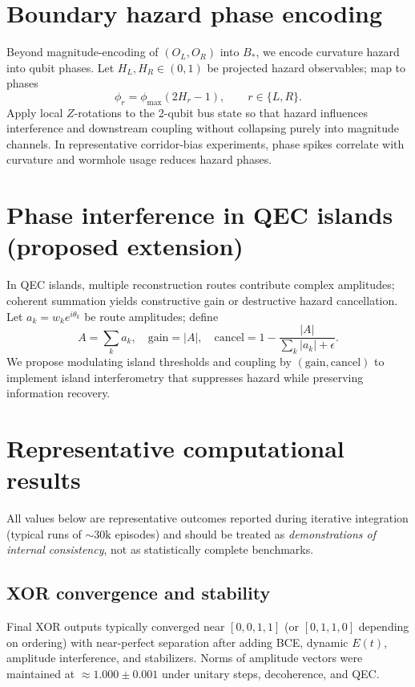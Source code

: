 \documentclass[11pt]{article}
\begin{document}
\section{Boundary hazard phase encoding}
\label{sec:busphase}
Beyond magnitude-encoding of $(O_L,O_R)$ into $B_{\ast}$, we encode curvature hazard into qubit phases. Let $H_L,H_R\in(0,1)$ be projected hazard observables; map to phases
\begin{equation}
\phi_r = \phi_{\max}(2H_r-1),\qquad r\in\{L,R\}.
\end{equation}
Apply local $Z$-rotations to the 2-qubit bus state so that hazard influences interference and downstream coupling without collapsing purely into magnitude channels. In representative corridor-bias experiments, phase spikes correlate with curvature and wormhole usage reduces hazard phases.

\section{Phase interference in QEC islands (proposed extension)}
In QEC islands, multiple reconstruction routes contribute complex amplitudes; coherent summation yields constructive gain or destructive hazard cancellation. Let $a_k=w_k e^{i\theta_k}$ be route amplitudes; define
\begin{equation}
A=\sum_k a_k,\quad \mathrm{gain}=|A|,\quad \mathrm{cancel}=1-\frac{|A|}{\sum_k |a_k|+\epsilon}.
\end{equation}
We propose modulating island thresholds and coupling by $(\mathrm{gain},\mathrm{cancel})$ to implement island interferometry that suppresses hazard while preserving information recovery.

\section{Representative computational results}
\label{sec:results}
All values below are representative outcomes reported during iterative integration (typical runs of $\sim 30\text{k}$ episodes) and should be treated as \emph{demonstrations of internal consistency}, not as statistically complete benchmarks.

\subsection{XOR convergence and stability}
Final XOR outputs typically converged near $[0,0,1,1]$ (or $[0,1,1,0]$ depending on ordering) with near-perfect separation after adding BCE, dynamic $E(t)$, amplitude interference, and stabilizers. Norms of amplitude vectors were maintained at $\approx 1.000\pm 0.001$ under unitary steps, decoherence, and QEC.
\end{document}
